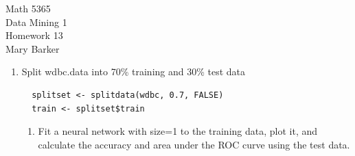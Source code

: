 \documentclass[11pt]{article}
\begin{document}
\noindent\large{Math 5365}\\
\large{Data Mining 1}\\
\large{Homework 13}\\
\large{Mary Barker}
\doublespace
\begin{enumerate}
\item 
  Split wdbc.data into 70\% training and 30\% test data

  \begin{Verbatim}
  splitset <- splitdata(wdbc, 0.7, FALSE)
  train <- splitset$train
  \end{Verbatim}
\begin{enumerate}
\item \label{i:pt1}
 Fit a neural network with size=1 to the training data, plot it, 
 and calculate the accuracy and area under the ROC curve using the 
 test data.


\end{enumerate}
\end{enumerate}
\end{document}
